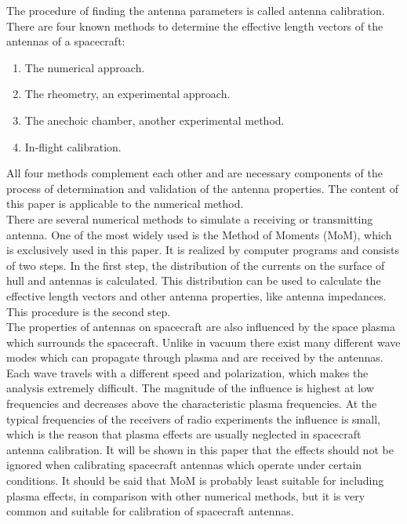 \documentclass[a4paper,11pt]{article}
\begin{document}
The procedure of finding the antenna parameters is called antenna calibration. There are four known methods to determine the effective length vectors of the antennas of a spacecraft:

\begin{enumerate}
\item The numerical approach.
\item The rheometry, an experimental approach.
\item The anechoic chamber, another experimental method.
\item In-flight calibration.
\end{enumerate}

All four methods complement each other and are necessary components of the process of determination and validation of the antenna properties. The content of this paper is applicable to the numerical method.\\

There are several numerical methods to simulate a receiving or transmitting antenna. One of the most widely used is the Method of Moments
(MoM), which is exclusively used in this paper. It is realized by computer programs and consists of two steps. In the first step, the distribution of the currents on the surface of hull and antennas is calculated. This distribution can be used to calculate the effective length vectors and other antenna properties, like antenna impedances. This procedure is the second step.\\

The properties of antennas on spacecraft are also influenced by the space plasma which surrounds the spacecraft. Unlike in vacuum there exist many different wave modes which can propagate through plasma and are received by the antennas. Each wave travels with a different speed and polarization, which makes the analysis extremely difficult. The magnitude of the influence is highest at low frequencies and decreases above the characteristic plasma frequencies. At the typical frequencies of the receivers of radio experiments the influence is small, which is the reason that plasma effects are usually neglected in spacecraft antenna calibration. It will be shown in this paper that the effects should not be ignored when calibrating spacecraft antennas which operate under certain conditions. It should be said that MoM is probably least suitable for including plasma effects, in comparison with other numerical methods, but it is very common and suitable for calibration of spacecraft antennas.\\
\end{document}
